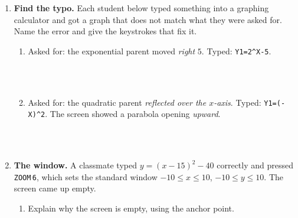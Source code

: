 \documentclass[10pt]{article}
\begin{document}
\vspace{0.10in}

\boxguard[30]
\begin{tcolorbox}[colback=white, colframe=black!40, title=\textbf{Tier E --- Extension},
    fonttitle=\bfseries, arc=2mm, left=3mm, right=3mm, top=2mm, bottom=2mm, breakable]
\small

\begin{enumerate}[leftmargin=1.6em, itemsep=4pt, topsep=2pt]
  \item \textbf{Find the typo.} Each student below typed something into a graphing calculator and
        got a graph that does not match what they were asked for. Name the error and give the
        keystrokes that fix it.
        \begin{enumerate}[label=(\alph*), leftmargin=1.6em, itemsep=3pt, topsep=3pt]
          \item Asked for: the exponential parent moved \emph{right} $5$. Typed:
                \texttt{Y1=2\^{}X-5}.

\\
\\

          \item Asked for: the quadratic parent \emph{reflected over the $x$-axis}. Typed:
                \texttt{Y1=(-X)\^{}2}. The screen showed a parabola opening \emph{upward}.

\\
\\
        \end{enumerate}

  \item \textbf{The window.} A classmate typed $y=(x-15)^2-40$ correctly and pressed
        \texttt{ZOOM}\,\texttt{6}, which sets the standard window $-10 \le x \le 10$,
        $-10 \le y \le 10$. The screen came up empty.
        \begin{enumerate}[label=(\alph*), leftmargin=1.6em, itemsep=3pt, topsep=3pt]
          \item Explain why the screen is empty, using the anchor point.


\end{enumerate}
\end{enumerate}
\end{tcolorbox}
\end{document}
